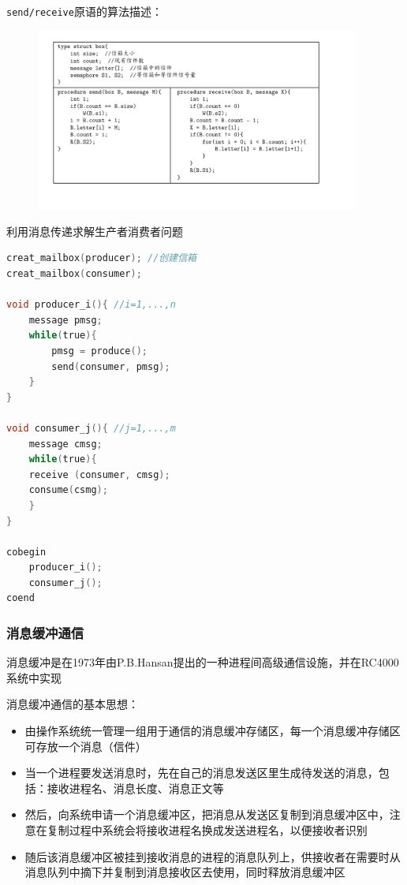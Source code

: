 \documentclass[cs4size,a4paper,10pt]{ctexart}
\begin{document}
	\verb|send/receive|原语的算法描述：
	\begin{figure}[H]
		\centering
		\includegraphics[width=0.95\textwidth]{img/send receive原语的算法描述.pdf}
	\end{figure}

	利用消息传递求解生产者消费者问题
	\begin{lstlisting}[language=C, keywordstyle=\color{black}]
creat_mailbox(producer); //创建信箱
creat_mailbox(consumer);

void producer_i(){ //i=1,...,n
	message pmsg;
	while(true){
		pmsg = produce(); 
		send(consumer, pmsg);
	} 
}

void consumer_j(){ //j=1,...,m
	message cmsg;
	while(true){
	receive (consumer, cmsg);
	consume(csmg); 
	}
}

cobegin
	producer_i();
	consumer_j();
coend
	\end{lstlisting}

	\subsubsection{消息缓冲通信}
	消息缓冲是在1973年由P.B.Hansan提出的一种进程间高级通信设施，并在RC4000系统中实现

	消息缓冲通信的基本思想：
	\begin{itemize}
		\item 由操作系统统一管理一组用于通信的消息缓冲存储区，每一个消息缓冲存储区可存放一个消息（信件）
		\item 当一个进程要发送消息时，先在自己的消息发送区里生成待发送的消息，包括：接收进程名、消息长度、消息正文等
		\item 然后，向系统申请一个消息缓冲区，把消息从发送区复制到消息缓冲区中，注意在复制过程中系统会将接收进程名换成发送进程名，以便接收者识别
		\item 随后该消息缓冲区被挂到接收消息的进程的消息队列上，供接收者在需要时从消息队列中摘下并复制到消息接收区去使用，同时释放消息缓冲区
	\end{itemize}
\end{document}
